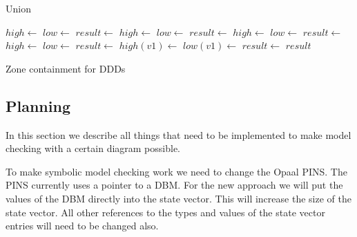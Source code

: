 \begin{algorithm}
\begin{algorithmic}[1]
\caption{Union}\label{alg:union}
		\State $high \gets$ 
		\State $low \gets$ 
		\State $result \gets$  
		\State $high \gets$ 
		\State $low \gets$ 
		\State $result \gets$  
		\State $high \gets$ 
		\State $low \gets$ 
		\State $result \gets$ 
		\State $high \gets$ 
		\State $low \gets$ 
		\State $result \gets$ 
		\State $high(v1) \gets$ 
		\State $low(v1) \gets$ 
		\State $result \gets$ 
	\EndIf
	\State \Return $result$
\EndProcedure
\end{algorithmic}
\end{algorithm}

\begin{algorithm}
\caption{Zone containment for DDDs}\label{alg:contain}
\begin{algorithmic}[1]
		\State{} 
	\EndIf
\EndProcedure
\end{algorithmic}
\end{algorithm}

\subsection{Planning}
In this section we describe all things that need to be implemented to make model checking with a certain diagram possible. 

To make symbolic model checking work we need to change the Opaal PINS. The PINS currently uses a pointer to a DBM. For the new approach we will put the values of the DBM directly into the state vector. This will increase the size of the state vector. All other references to the types and values of the state vector entries will need to be changed also. 

